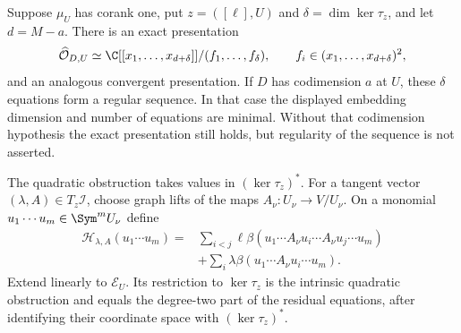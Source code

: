 \begin{theorem}
\label{thm:minimal-residual-equations}
Suppose $\mu_U$ has corank one, put $z=([\ell],U)$ and
$\delta=\dim\ker\tau_z$, and let $d=M-a$. There is an exact
presentation
\begin{equation}\label{eq:minimal-residual-local-ring}
 \widehat{\mathcal O}_{D,U}
       \simeq\C[[x_1,\ldots,x_{d+\delta}]]/(f_1,\ldots,f_\delta),
       \qquad f_i\in(x_1,\ldots,x_{d+\delta})^2,
\end{equation}
and an analogous convergent presentation. If $D$ has codimension
$a$ at $U$, these $\delta$ equations form a regular sequence. In
that case the displayed embedding dimension and number of equations
are minimal. Without that codimension hypothesis the exact
presentation still holds, but regularity of the sequence is not
asserted.

The quadratic obstruction takes values in $(\ker\tau_z)^*$.
For a tangent vector $(\lambda,A)\in T_z\mathcal I$, choose graph
lifts of the maps $A_\nu:U_\nu\to V/U_\nu$. On a monomial
$u_1\cdots u_m\in\Sym^mU_\nu$ define
\begin{equation}\label{eq:quadratic-polar-obstruction}
 \begin{split}
 \mathcal H_{\lambda,A}(u_1\cdots u_m)
 ={}&\sum_{i<j}\ell\beta(u_1\cdots A_\nu u_i\cdots
                                A_\nu u_j\cdots u_m)\\
 &+\sum_i\lambda\beta(u_1\cdots A_\nu u_i\cdots u_m).
 \end{split}
\end{equation}
Extend linearly to $\mathcal E_U$. Its restriction to
$\ker\tau_z$ is the intrinsic quadratic obstruction and equals the
degree-two part of the residual equations, after identifying their
coordinate space with $(\ker\tau_z)^*$.
\end{theorem}
